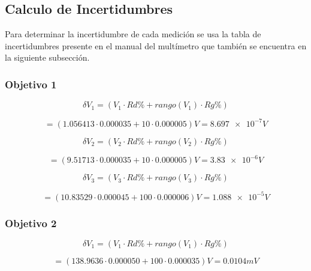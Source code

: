 \documentclass[DIV=calc, paper=a4, fontsize=11pt]{scrartcl}
\begin{document}
\begin{multicols}{2}
\subsection*{Calculo de Incertidumbres}
Para determinar la incertidumbre de cada medición se usa la tabla de incertidumbres presente en el manual del multímetro que también se encuentra en la siguiente subsección.

\subsubsection*{Objetivo 1}



\begin{equation*}
    \delta V_1 = (V_1 \cdot Rd\% + rango(V_1) \cdot Rg\%) 
\end{equation*}

\begin{equation*}
    = (1.056413 \cdot 0.000035 + 10 \cdot 0.000005 ) V = \num{8.697e-7} V
\end{equation*}

\begin{equation*}
    \delta V_2 = (V_2 \cdot Rd\% + rango(V_2) \cdot Rg\%) 
\end{equation*}

\begin{equation*}
    = (9.51713 \cdot 0.000035 + 10 \cdot 0.000005 ) V = \num{3.83e-6} V
\end{equation*}

\begin{equation*}
    \delta V_3 = (V_3 \cdot Rd\% + rango(V_3) \cdot Rg\%) 
\end{equation*}

\begin{equation*}
    = (10.83529 \cdot 0.000045 + 100 \cdot 0.000006 ) V = \num{1.088e-5} V
\end{equation*}

\subsubsection*{Objetivo 2}

\begin{equation*}
    \delta V_1 = (V_1 \cdot Rd\% + rango(V_1) \cdot Rg\%) 
\end{equation*}

\begin{equation*}
    = (138.9636 \cdot 0.000050 + 100 \cdot 0.000035 ) V = 0.0104 mV
\end{equation*}


\end{multicols}
\end{document}
